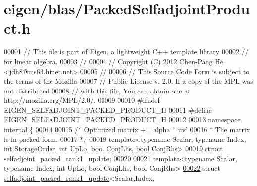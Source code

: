 \hypertarget{eigen_2blas_2_packed_selfadjoint_product_8h_source}{}\section{eigen/blas/\+Packed\+Selfadjoint\+Product.h}
\label{eigen_2blas_2_packed_selfadjoint_product_8h_source}

\begin{DoxyCode}
00001 \textcolor{comment}{// This file is part of Eigen, a lightweight C++ template library}
00002 \textcolor{comment}{// for linear algebra.}
00003 \textcolor{comment}{//}
00004 \textcolor{comment}{// Copyright (C) 2012 Chen-Pang He <jdh8@ms63.hinet.net>}
00005 \textcolor{comment}{//}
00006 \textcolor{comment}{// This Source Code Form is subject to the terms of the Mozilla}
00007 \textcolor{comment}{// Public License v. 2.0. If a copy of the MPL was not distributed}
00008 \textcolor{comment}{// with this file, You can obtain one at http://mozilla.org/MPL/2.0/.}
00009 
00010 \textcolor{preprocessor}{#ifndef EIGEN\_SELFADJOINT\_PACKED\_PRODUCT\_H}
00011 \textcolor{preprocessor}{#define EIGEN\_SELFADJOINT\_PACKED\_PRODUCT\_H}
00012 
00013 \textcolor{keyword}{namespace }\hyperlink{namespaceinternal}{internal} \{
00014 
00015 \textcolor{comment}{/* Optimized matrix += alpha * uv'}
00016 \textcolor{comment}{ * The matrix is in packed form.}
00017 \textcolor{comment}{ */}
00018 \textcolor{keyword}{template}<\textcolor{keyword}{typename} Scalar, \textcolor{keyword}{typename} Index, \textcolor{keywordtype}{int} StorageOrder, \textcolor{keywordtype}{int} UpLo, \textcolor{keywordtype}{bool} ConjLhs, \textcolor{keywordtype}{bool} ConjRhs>
\hyperlink{structinternal_1_1selfadjoint__packed__rank1__update}{00019} \textcolor{keyword}{struct }\hyperlink{structinternal_1_1selfadjoint__packed__rank1__update}{selfadjoint\_packed\_rank1\_update};
00020 
00021 \textcolor{keyword}{template}<\textcolor{keyword}{typename} Scalar, \textcolor{keyword}{typename} Index, \textcolor{keywordtype}{int} UpLo, \textcolor{keywordtype}{bool} ConjLhs, \textcolor{keywordtype}{bool} ConjRhs>
\hyperlink{structinternal_1_1selfadjoint__packed__rank1__update_3_01_scalar_00_01_index_00_01_col_major_00_cda55a2b2bf1b1755d1ad2703b37584d}{00022} \textcolor{keyword}{struct }\hyperlink{structinternal_1_1selfadjoint__packed__rank1__update}{selfadjoint\_packed\_rank1\_update}<Scalar,Index,

\end{DoxyCode}
